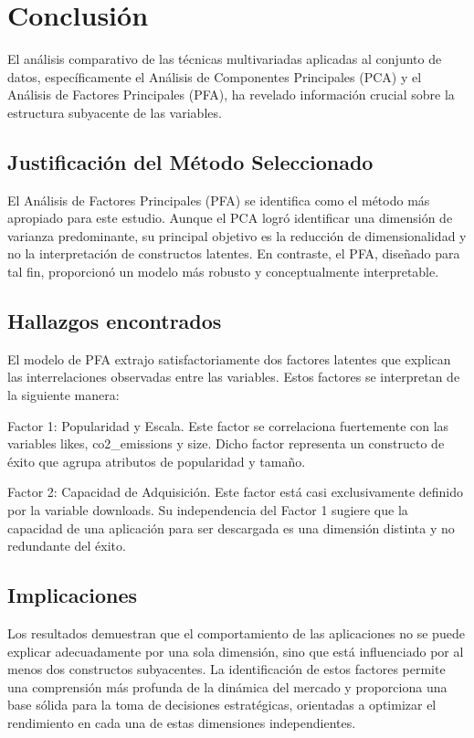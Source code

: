 \documentclass[journal]{IEEEtran}
\begin{document}
	\section{Conclusión}
	\label{sec:conclusion}
	El análisis comparativo de las técnicas multivariadas aplicadas al conjunto de datos, específicamente el Análisis de Componentes Principales (PCA) y el Análisis de Factores Principales (PFA), ha revelado información crucial sobre la estructura subyacente de las variables.

	\subsection{Justificación del Método Seleccionado}
	El Análisis de Factores Principales (PFA) se identifica como el método más apropiado para este estudio. Aunque el PCA logró identificar una dimensión de varianza predominante, su principal objetivo es la reducción de dimensionalidad y no la interpretación de constructos latentes. En contraste, el PFA, diseñado para tal fin, proporcionó un modelo más robusto y conceptualmente interpretable.

	\subsection{Hallazgos encontrados}
	El modelo de PFA extrajo satisfactoriamente dos factores latentes que explican las interrelaciones observadas entre las variables.  Estos factores se interpretan de la siguiente manera:

	Factor 1: Popularidad y Escala. Este factor se correlaciona fuertemente con las variables likes, co2\_emissions y size. Dicho factor representa un constructo de éxito que agrupa atributos de popularidad y tamaño.

	Factor 2: Capacidad de Adquisición. Este factor está casi exclusivamente definido por la variable downloads. Su independencia del Factor 1 sugiere que la capacidad de una aplicación para ser descargada es una dimensión distinta y no redundante del éxito.

	\subsection{Implicaciones}
	Los resultados demuestran que el comportamiento de las aplicaciones no se puede explicar adecuadamente por una sola dimensión, sino que está influenciado por al menos dos constructos subyacentes. La identificación de estos factores permite una comprensión más profunda de la dinámica del mercado y proporciona una base sólida para la toma de decisiones estratégicas, orientadas a optimizar el rendimiento en cada una de estas dimensiones independientes.
\end{document}

